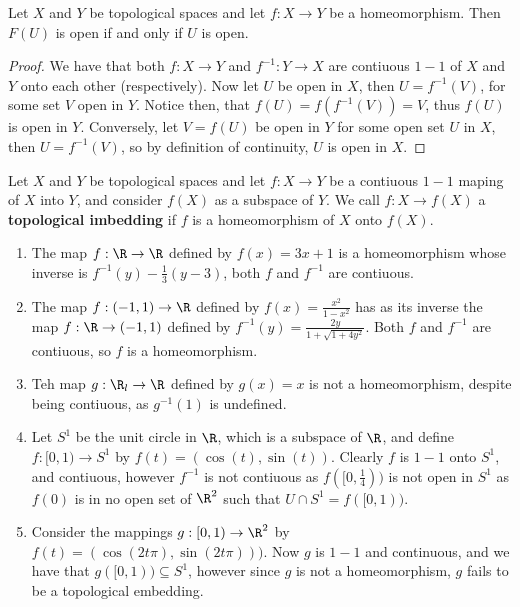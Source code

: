 \begin{lemma}\label{1.7.2} 
    Let $X$ and  $Y$ be topological spaces and let $f:X \rightarrow Y$ be a homeomorphism. Then
    $F(U)$ is open if and only if $U$ is open.
\end{lemma}
\begin{proof}
    We have that both $f:X \rightarrow Y$ and  $f^{-1}:Y \rightarrow X$ are contiuous $1-1$ of $X$
    and  $Y$ onto each other  (respectively). Now let $U$ be open in  $X$, then $U=f^{-1}(V)$, for 
    some set  $V$ open in $Y$. Notice then, that $f(U)=f(f^{-1}(V))=V$, thus $f(U)$ is open in $Y$. 
    Conversely, let $V=f(U)$ be open in $Y$ for some open set  $U$ in  $X$, then  $U=f^{-1}(V)$, so
    by definition of continuity, $U$  is open in $X$.
\end{proof}

\begin{definition}
    Let $X$ and  $Y$ be topological spaces and let  $f:X \rightarrow Y$ be a contiuous  $1-1$ maping
    of  $X$ into  $Y$, and consider  $f(X)$ as a subspace of $Y$. We call  $f:X \rightarrow f(X)$ a
    \textbf{topological imbedding} if $f$ is a homeomorphism of $X$ onto  $f(X)$.
\end{definition}

\begin{example}
    \begin{enumerate}[label=(\arabic*)]
        \item The map $f:\R \rightarrow \R$ defined by  $f(x)=3x+1$ is a homeomorphism whose inverse
            is $f^{-1}(y)-\frac{1}{3}(y-3)$, both $f$ and  $f^{-1}$ are contiuous.

        \item The map $f:(-1,1) \rightarrow \R$ defined by $f(x)=\frac{x^2}{1-x^2}$ has as its
            inverse the map $f:\R \rightarrow (-1,1)$ defined by
            $f^{-1}(y)=\frac{2y}{1+\sqrt{1+4y^2}}$. Both $f$ and  $f^{-1}$ are contiuous, so $f$ is
            a homeomorphism.

        \item Teh map  $g:\R_l \rightarrow \R$ defined by  $g(x)=x$ is not a homeomorphism, despite
            being contiuous, as $g^{-1}(1)$ is undefined.

        \item Let $S^1$ be the unit circle in $\R$, which is a subspace of $\R$, and define
            $f:[0,1) \rightarrow S^1$ by $f(t)=(\cos(t),\sin(t))$. Clearly $f$ is  $1-1$ onto
            $S^1$, and contiuous, however  $f^{-1}$ is not contiuous as $f([0,\frac{1}{4}))$ is not
            open in $S^1$ as  $f(0)$ is in no open set of $\R^2$ such that  $U \cap S^1=f([0,1))$.

        \item Consider the mappings $g:[0,1) \rightarrow \R^2$ by $f(t)=(\cos(2t\pi),\sin(2t\pi)))$.
            Now $g$ is  $1-1$ and continuous, and we have that  $g([0,1)) \subseteq S^1$, however
            since $g$ is not a homeomorphism,  $g$ fails to be a topological embedding.
    \end{enumerate}
\end{example} 

